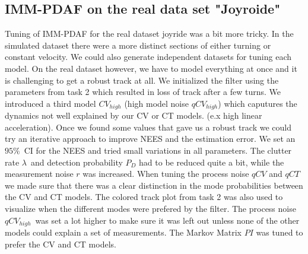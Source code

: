 \subsection{IMM-PDAF on the real data set "Joyroide"}
Tuning of IMM-PDAF for the real dataset joyride was a bit more tricky. In the simulated dataset there were a more distinct sections of either turning or constant velocity. We could also generate independent datasets for tuning each model. On the real dataset however, we have to model everything at once and it is challenging to get a robust track at all. We initialized the filter using the parameters from task 2 which resulted in loss of track after a few turns. We introduced a third model $CV_{high}$ (high model noise $qCV_{high}$) which caputures the dynamics not well explained by our CV or CT models. (e.x high linear acceleration). Once we found some values that gave us a robust track we could try an iterative approach to improve NEES and the estimation error. We set an $95\%$ CI for the NEES and tried small variations in all parameters. The clutter rate $\lambda$ and detection probability $P_D$ had to be reduced quite a bit, while the measurement noise $r$ was increased. When tuning the process noise $qCV$ and $qCT$ we made sure that there was a clear distinction in the mode probabilities between the CV and CT models. The colored track plot from task 2 was also used to visualize when the different modes were prefered by the filter. The process noise $qCV_{high}$ was set a lot higher to make sure it was left out unless none of the other models could explain a set of measurements.
The Markov Matrix $PI$ was tuned to prefer the CV and CT models. 

